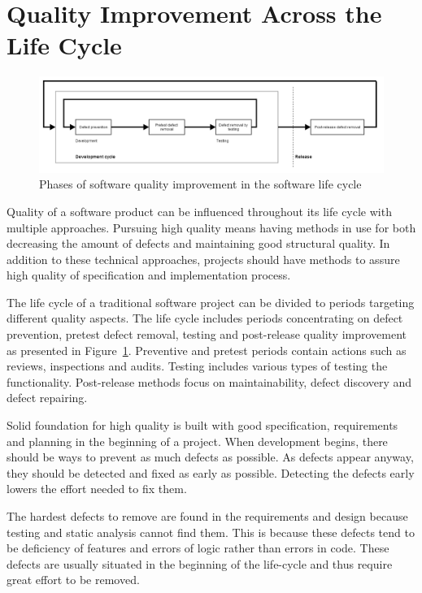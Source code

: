 \section{Quality Improvement Across the Life Cycle}
\label{sec:life_cycle}


\begin{figure}[t]
\begin{center}
\includegraphics[width=1.0\textwidth]{image/quality_lifecycle.png}
\end{center}
\caption{Phases of software quality improvement in the software life cycle}
\label{fig:quality_life_cycle}
\end{figure}

Quality of a software product can be influenced throughout its life cycle with multiple approaches. Pursuing high quality means having methods in use for both decreasing the amount of defects and maintaining good structural quality. In addition to these technical approaches, projects should have methods to assure high quality of specification and implementation process.

The life cycle of a traditional software project can be divided to periods targeting different quality aspects. The life cycle includes periods concentrating on defect prevention, pretest defect removal, testing and post-release quality improvement as presented in Figure~\ref{fig:quality_life_cycle}. Preventive and pretest periods contain actions such as reviews, inspections and audits. Testing includes various types of testing the functionality. Post-release methods focus on maintainability, defect discovery and defect repairing.

Solid foundation for high quality is built with good specification, requirements and planning in the beginning of a project. When development begins, there should be ways to prevent as much defects as possible. As defects appear anyway, they should be detected and fixed as early as possible. Detecting the defects early lowers the effort needed to fix them. 

The hardest defects to remove are found in the requirements and design because testing and static analysis cannot find them. This is because these defects tend to be deficiency of features and errors of logic rather than errors in code. These defects are usually situated in the beginning of the life-cycle and thus require great effort to be removed. 

